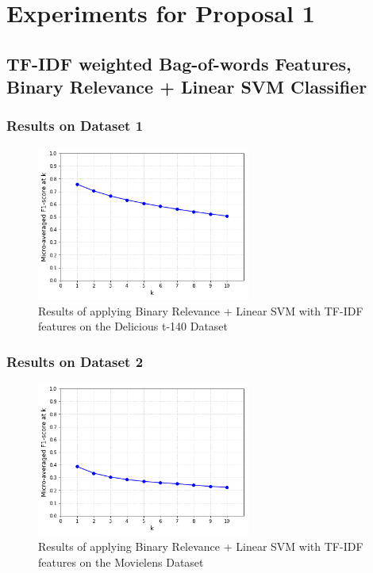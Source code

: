 \section{Experiments for Proposal 1}\label{section:experiment_part_1}


\subsection{TF-IDF weighted Bag-of-words Features, Binary Relevance + Linear SVM Classifier}

\subsubsection{Results on Dataset 1}

\begin{figure}[H]
    \centering
    \includegraphics[width=7cm]{chapters/05_experiments/images/svm-tf-idf-delicious-20-frac.png}
    \caption{Results of applying Binary Relevance + Linear SVM with TF-IDF features on the Delicious t-140 Dataset}
    \label{fig:ovr_svm_movielens}
\end{figure}

\subsubsection{Results on Dataset 2}

\begin{figure}[H]
    \centering
    \includegraphics[width=7cm]{chapters/05_experiments/images/svm-tf-idf-movielens.png}
    \caption{Results of applying Binary Relevance + Linear SVM with TF-IDF features on the Movielens Dataset}
    \label{fig:ovr_svm_movielens}
\end{figure}

